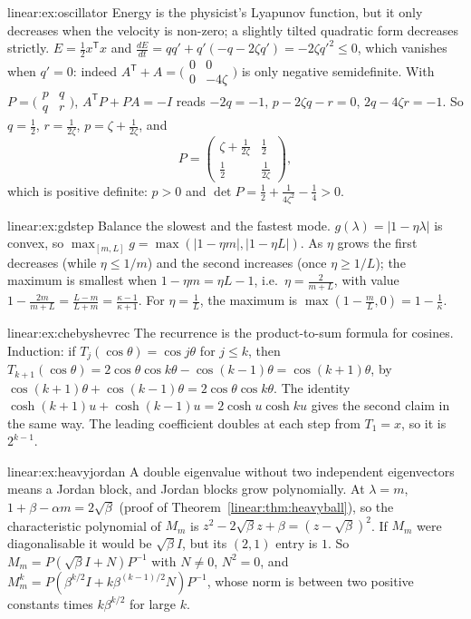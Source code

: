 \begin{solution}{linear:ex:oscillator}
\idea Energy is the physicist's Lyapunov function, but it only decreases when the velocity is non-zero; a slightly tilted quadratic
form decreases strictly.
\writeup $E=\frac12x^{\mathsf T}x$ and $\frac{dE}{dt}=qq'+q'(-q-2\zeta q')=-2\zeta q'^2\le0$, which vanishes when $q'=0$: indeed $A^{\mathsf T}+A=
\bigl(\begin{smallmatrix}0&0\\0&-4\zeta\end{smallmatrix}\bigr)$ is only negative semidefinite. With $P=\bigl(\begin{smallmatrix}p&q\\q&r\end{smallmatrix}
\bigr)$, $A^{\mathsf T}P+PA=-I$ reads $-2q=-1$, $p-2\zeta q-r=0$, $2q-4\zeta r=-1$. So $q=\frac12$, $r=\frac1{2\zeta}$, $p=\zeta+\frac1{2\zeta}$, and
\[
P=\begin{pmatrix}\zeta+\frac1{2\zeta}&\frac12\\\frac12&\frac1{2\zeta}\end{pmatrix},
\]
which is positive definite: $p>0$ and $\det P=\frac12+\frac1{4\zeta^2}-\frac14>0$.
\end{solution}

\begin{solution}{linear:ex:gdstep}
\idea Balance the slowest and the fastest mode.
\writeup $g(\lambda)=|1-\eta\lambda|$ is convex, so $\max_{[m,L]}g=\max(|1-\eta m|,|1-\eta L|)$. As $\eta$ grows the first decreases (while
$\eta\le1/m$) and the second increases (once $\eta\ge1/L$); the maximum is smallest when $1-\eta m=\eta L-1$, i.e.\ $\eta=\frac2{m+L}$, with
value $1-\frac{2m}{m+L}=\frac{L-m}{L+m}=\frac{\kappa-1}{\kappa+1}$. For $\eta=\frac1L$, the maximum is $\max(1-\frac mL,0)=1-\frac1\kappa$.
\end{solution}

\begin{solution}{linear:ex:chebyshevrec}
\idea The recurrence is the product-to-sum formula for cosines.
\writeup Induction: if $T_j(\cos\theta)=\cos j\theta$ for $j\le k$, then $T_{k+1}(\cos\theta)=2\cos\theta\cos k\theta-\cos(k-1)\theta=\cos(k+1)\theta$, by
$\cos(k+1)\theta+\cos(k-1)\theta=2\cos\theta\cos k\theta$. The identity $\cosh(k+1)u+\cosh(k-1)u=2\cosh u\cosh ku$ gives the second claim in the same
way. The leading coefficient doubles at each step from $T_1=x$, so it is $2^{k-1}$.
\end{solution}

\begin{solution}{linear:ex:heavyjordan}
\idea A double eigenvalue without two independent eigenvectors means a Jordan block, and Jordan blocks grow polynomially.
\writeup At $\lambda=m$, $1+\beta-\alpha m=2\sqrt\beta$ (proof of Theorem~\ref{linear:thm:heavyball}), so the characteristic polynomial of $M_m$ is
$z^2-2\sqrt\beta z+\beta=(z-\sqrt\beta)^2$. If $M_m$ were diagonalisable it would be $\sqrt\beta I$, but its $(2,1)$ entry is $1$. So $M_m=
P(\sqrt\beta I+N)P^{-1}$ with $N\ne0$, $N^2=0$, and $M_m^k=P(\beta^{k/2}I+k\beta^{(k-1)/2}N)P^{-1}$, whose norm is between two positive
constants times $k\beta^{k/2}$ for large $k$.
\end{solution}

